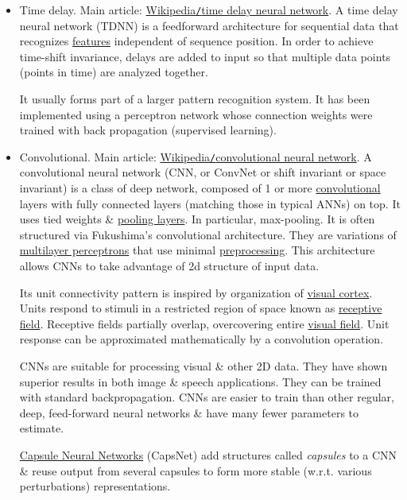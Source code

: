 \documentclass{article}
\begin{document}
\begin{itemize}
	\item {\sf Time delay.} Main article: \href{https://en.wikipedia.org/wiki/Time_delay_neural_network}{Wikipedia{\tt/}time delay neural network}. A time delay neural network (TDNN) is a feedforward architecture for sequential data that recognizes \href{https://en.wikipedia.org/wiki/Feature_(machine_learning)}{features} independent of sequence position. In order to achieve time-shift invariance, delays are added to input so that multiple data points (points in time) are analyzed together.
	
	It usually forms part of a larger pattern recognition system. It has been implemented using a perceptron network whose connection weights were trained with back propagation (supervised learning).
	\item {\sf Convolutional.} Main article: \href{https://en.wikipedia.org/wiki/Convolutional_neural_network}{Wikipedia{\tt/}convolutional neural network}. A convolutional neural network (CNN, or ConvNet or shift invariant or space invariant) is a class of deep network, composed of 1 or more \href{https://en.wikipedia.org/wiki/Convolution}{convolutional} layers with fully connected layers (matching those in typical ANNs) on top. It uses tied weights \& \href{https://en.wikipedia.org/wiki/Pooling_layer}{pooling layers}. In particular, max-pooling. It is often structured via Fukushima's convolutional architecture. They are variations of \href{https://en.wikipedia.org/wiki/Multilayer_perceptron}{multilayer perceptrons} that use minimal \href{https://en.wikipedia.org/wiki/Data_pre-processing}{preprocessing}. This architecture allows CNNs to take advantage of 2d structure of input data.
	
	Its unit connectivity pattern is inspired by organization of \href{https://en.wikipedia.org/wiki/Visual_cortex}{visual cortex}. Units respond to stimuli in a restricted region of space known as \href{https://en.wikipedia.org/wiki/Receptive_field}{receptive field}. Receptive fields partially overlap, overcovering entire \href{https://en.wikipedia.org/wiki/Visual_field}{visual field}. Unit response can be approximated mathematically by a convolution operation.
	
	CNNs are suitable for processing visual \& other 2D data. They have shown superior results in both image \& speech applications. They can be trained with standard backpropagation. CNNs are easier to train than other regular, deep, feed-forward neural networks \& have many fewer parameters to estimate.
	
	\href{https://en.wikipedia.org/wiki/Capsule_neural_network}{Capsule Neural Networks} (CapsNet) add structures called {\it capsules} to a CNN \& reuse output from several capsules to form more stable (w.r.t. various perturbations) representations.
	

\end{itemize}
\end{document}
